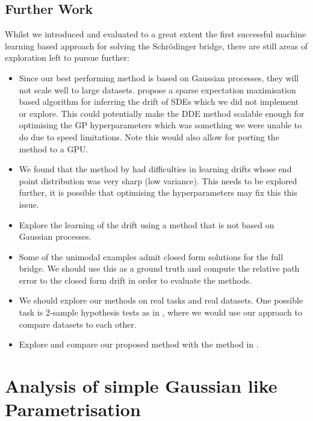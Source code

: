 \documentclass[a4paper,12pt,twoside,openright]{report}
\theoremstyle{definition}
\begin{document}
\section{Further Work}

Whilst we introduced and evaluated to a great extent the first successful machine learning based approach for solving the Schrödinger bridge, there are still areas of exploration left to pursue further:

\begin{itemize}
    \item Since our best performing method is based on Gaussian processes, they will not scale well to large datasets. \cite{ruttor2013approximate} propose a sparse expectation maximisation based algorithm for inferring the drift of SDEs which we did not implement or explore. This could potentially make the DDE method scalable enough for optimising the GP hyperparameters which was something we were unable to do due to speed limitations. Note this would also allow for porting the method to a GPU.
    \item We found that the method by \cite{ruttor2013approximate} had difficulties in learning drifts whose end point distribution was very sharp (low variance). This needs to be explored further, it is possible that optimising the hyperparameters may fix this this issue.  
    \item Explore the learning of the drift using a method that is not based on Gaussian processes.
    \item Some of the unimodal examples admit closed form solutions for the full bridge. We should use this as a ground truth and compute the relative path error to the closed form drift in order to evaluate the methods.
    \item We should explore our methods on real tasks and real datasets. One possible task is 2-sample hypothesis tests as in \cite{gretton2012kernel}, where we would use our approach to compare datasets to each other. 
    \item Explore and compare our proposed method with the method in \cite{bernton2019schr}.
\end{itemize}

\appendix


\singlespacing

\chapter{Analysis of simple Gaussian like Parametrisation}\label{app:bad_gauss}
\end{document}
